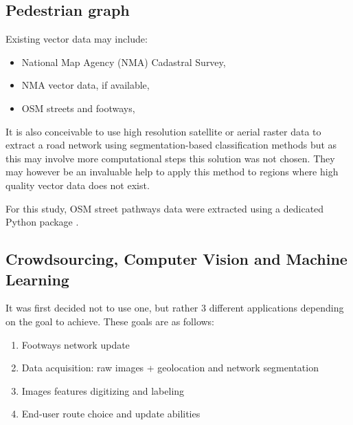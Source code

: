 \documentclass[10pt,conference,a4paper]{IEEEtran}
\begin{document}
\subsection{Pedestrian graph}
Existing vector data may include:
\begin{itemize}\renewcommand\labelitemi{--}\setlength\itemsep{0.0em}
\item National Map Agency (NMA) Cadastral Survey,
\item NMA vector data, if available,
\item OSM streets and footways,
\end{itemize}

It is also conceivable to use high resolution satellite or aerial raster data to extract a road network using segmentation-based classification methods but as this may involve more computational steps this solution was not chosen.
They may however be an invaluable help to apply this method to regions where high quality vector data does not exist. 

For this study, OSM street pathways data were extracted using a dedicated Python package \cite{boeing_osmnx:_2017}.


\subsection{Crowdsourcing, Computer Vision and Machine Learning}
It was first decided not to use one, but rather 3 different applications depending on the goal to achieve. These goals are as follows:
\begin{enumerate}\setlength\itemsep{0.0em}
\item Footways network update
\item Data acquisition: raw images + geolocation and network segmentation
\item Images features digitizing and labeling %
\item End-user route choice and update abilities
\end{enumerate}
\end{document}
